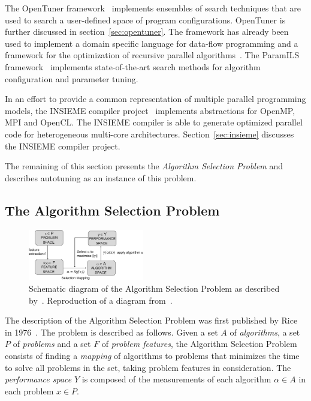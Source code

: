 \documentclass[a4paper, 12pt]{article}
\begin{document}
The OpenTuner framework~\cite{ansel2014opentuner} implements ensembles of search
techniques that are used to search a user-defined space of program
configurations. OpenTuner is further discussed in section~\ref{sec:opentuner}.
The framework has already been used to implement a domain specific language
for data-flow programming \cite{bosboom2014streamjit}
and a framework for the optimization of recursive parallel
algorithms~\cite{eliahu2015frpa}. The ParamILS
framework~\cite{hutter2009paramils} implements state-of-the-art search methods
for algorithm configuration and parameter tuning.

In an effort to provide a common representation of multiple parallel
programming models, the INSIEME compiler project~\cite{jordan2012multi}
implements abstractions for OpenMP, MPI and OpenCL. The INSIEME compiler is
able to generate optimized parallel code for heterogeneous multi-core
architectures. Section~\ref{sec:insieme} discusses the INSIEME compiler project.

The remaining of this section presents the \emph{Algorithm Selection Problem}
and describes autotuning as an instance of this problem.

\subsection{The Algorithm Selection Problem}

\begin{figure}[H]
    \centering
    \includegraphics[width=0.45\textwidth]{algoselframe}
    \captionsetup{width=0.64\textwidth}
    \caption{Schematic diagram of the Algorithm Selection Problem as described by~\citet{rice1976algorithm}. Reproduction of a diagram from~\citet{smith2008cross}.}
    \label{fig:algoselframe}
\end{figure}

The description of the Algorithm Selection Problem was first published by Rice
in 1976~\cite{rice1976algorithm}. The problem is described as follows.  Given a
set $A$ of \emph{algorithms}, a set $P$ of \emph{problems} and a set $F$ of
\emph{problem features}, the Algorithm Selection Problem consists of finding a
\emph{mapping} of algorithms to problems that minimizes the time to solve all
problems in the set, taking problem features in consideration. The
\emph{performance space} $Y$ is composed of the measurements of each algorithm
$\alpha \in A$ in each problem $x \in P$. 
\end{document}
